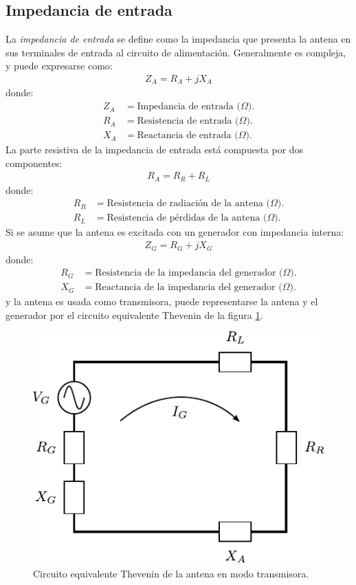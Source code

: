 \subsection{Impedancia de entrada}
\label{subsec_intro_imp_ent}

La \emph{impedancia de entrada} se define como la impedancia que presenta la antena en sus terminales de entrada al circuito de alimentación. Generalmente es compleja, y puede expresarse como:
\begin{align}
Z_A = R_A + jX_A
\label{ec_intro:33}
\end{align}
donde:
\begin{align*}
Z_A &= \text{Impedancia de entrada ($\Omega$).}\\
R_A &= \text{Resistencia de entrada ($\Omega$).}\\
X_A &= \text{Reactancia de entrada ($\Omega$).}
\end{align*}
La parte resistiva de la impedancia de entrada está compuesta por dos componentes:
\begin{align}
R_A = R_R +R_L
\label{ec_intro:34}
\end{align}
donde:
\begin{align*}
R_R &= \text{Resistencia de radiación de la antena ($\Omega$).}\\
R_L &= \text{Resistencia de pérdidas de la antena ($\Omega$).}
\end{align*}
Si se asume que la antena es excitada con un generador con impedancia interna:
\begin{align}
Z_G = R_G + jX_G
\label{ec_intro:35}
\end{align}
donde:
\begin{align*}
R_G &= \text{Resistencia de la impedancia del generador ($\Omega$).}\\
X_G &= \text{Reactancia de la impedancia del generador ($\Omega$).}
\end{align*}
y la antena es usada como transmisora, puede representarse la antena y el generador por el circuito equivalente Thevenin de la figura \ref{fig_intro:5}.
\begin{figure} [H]
\centering 
\includegraphics[scale = 1]{Figures/Intro/intro_5.pdf}
\caption{Circuito equivalente Thevenin de la antena en modo transmisora.}
\label{fig_intro:5}
\end{figure}
